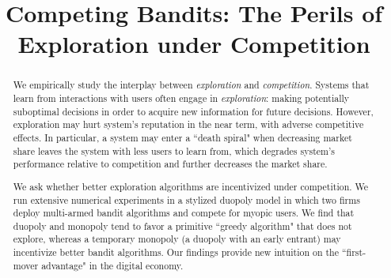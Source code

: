 \documentclass[letterpaper]{article}
\theoremstyle{definition}
\begin{document}


\title{Competing Bandits: The Perils of Exploration under Competition}

\maketitle


\begin{abstract}
We empirically study the interplay between \textit{exploration} and \textit{competition}. Systems that learn from interactions with users
often engage in \emph{exploration}: making potentially suboptimal decisions in order to acquire new information for future decisions. However, exploration may hurt system's reputation in the near term, with adverse competitive effects. In particular, a system may enter a ``death spiral" when decreasing market share leaves the system with less users to learn from, which degrades system's performance relative to competition and further decreases the market share.

We ask whether better exploration algorithms are incentivized under competition. We run extensive numerical experiments in a stylized duopoly model in which two firms deploy multi-armed bandit algorithms and compete for myopic users.  We find that duopoly and monopoly tend to favor a primitive ``greedy algorithm" that does not explore, whereas a temporary monopoly (a duopoly with an early entrant) may incentivize better bandit algorithms. Our findings provide new intuition on the ``first-mover advantage" in the digital economy.
\end{abstract}
\end{document}
